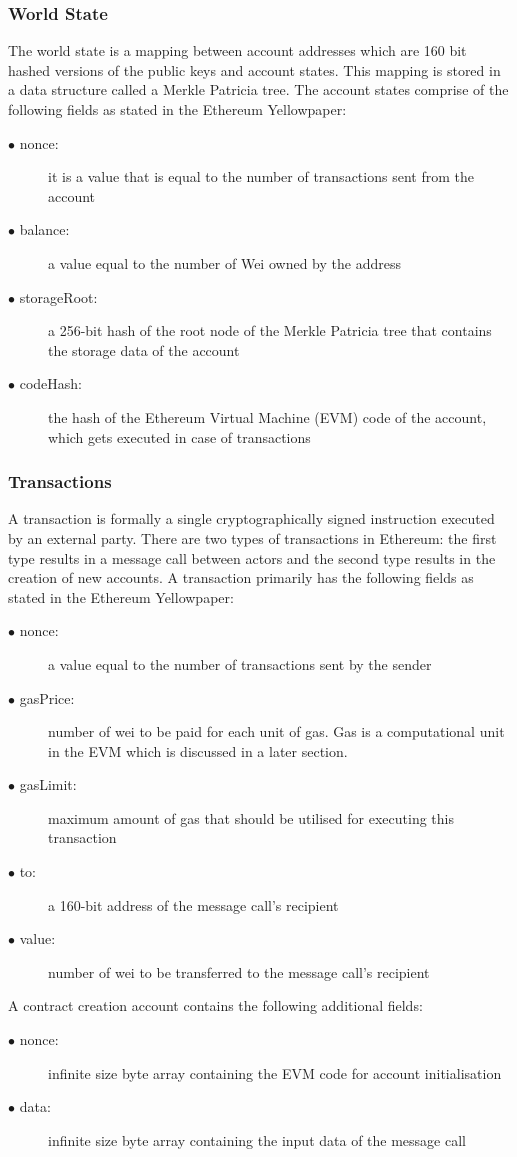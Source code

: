 \documentclass[a4paper,twoside,phd]{BYUPhys}
\begin{document}
\subsubsection{World State}
The world state is a mapping between account addresses which are 160 bit hashed versions of the public keys and account states\cite{Wood2018ETHEREUM:LEDGER}. This mapping is stored in a data structure called a Merkle Patricia tree. The account states comprise of the following fields as stated in the Ethereum Yellowpaper\cite{Wood2018ETHEREUM:LEDGER}:
\begin{description}
\item[$\bullet$ nonce:] it is a value that is equal to the number of transactions sent from the account
\item[$\bullet$ balance:] a value equal to the number of Wei owned by the address
\item[$\bullet$ storageRoot:] a 256-bit hash of the root node of the Merkle Patricia tree that contains the storage data of the account
\item[$\bullet$ codeHash:] the hash of the Ethereum Virtual Machine (EVM) code of the account, which gets executed in case of transactions
\end{description}
\subsubsection{Transactions}
A transaction is formally a single cryptographically signed instruction executed by an external party\cite{ButerinAPLATFORM}. There are two types of transactions in Ethereum: the first type results in a message call between actors and the second type results in the creation of new accounts\cite{Wood2018ETHEREUM:LEDGER}. A transaction primarily has the following fields as stated in the Ethereum Yellowpaper\cite{Wood2018ETHEREUM:LEDGER}:
\begin{description}
\item[$\bullet$ nonce:] a value equal to the number of transactions sent by the sender
\item[$\bullet$ gasPrice:] number of wei to be paid for each unit of gas. Gas is a computational unit in the EVM which is discussed in a later section.
\item[$\bullet$ gasLimit:] maximum amount of gas that should be utilised for executing this transaction
\item[$\bullet$ to:] a 160-bit address of the message call's recipient 
\item[$\bullet$ value:] number of wei to be transferred to the message call's recipient
\end{description}
A contract creation account contains the following additional fields\cite{Wood2018ETHEREUM:LEDGER}:
\begin{description}
\item[$\bullet$ nonce:] infinite size byte array containing the EVM code for account initialisation
\item[$\bullet$ data:] infinite size byte array containing the input data of the message call
\end{description}
\end{document}
